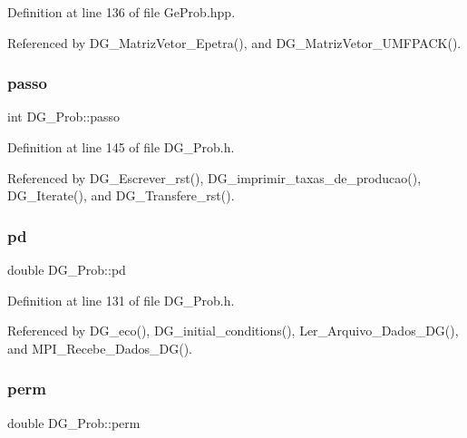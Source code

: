 Definition at line 136 of file Ge\+Prob.\+hpp.



Referenced by D\+G\+\_\+\+Matriz\+Vetor\+\_\+\+Epetra(), and D\+G\+\_\+\+Matriz\+Vetor\+\_\+\+U\+M\+F\+P\+A\+C\+K().

\mbox{\label{classDG__Prob_a496f504b7728fe91007014a47897132e}} 
\subsubsection{\texorpdfstring{passo}{passo}}
{\footnotesize\ttfamily int D\+G\+\_\+\+Prob\+::passo\hspace{0.3cm}{\ttfamily [private]}}



Definition at line 145 of file D\+G\+\_\+\+Prob.\+h.



Referenced by D\+G\+\_\+\+Escrever\+\_\+rst(), D\+G\+\_\+imprimir\+\_\+taxas\+\_\+de\+\_\+producao(), D\+G\+\_\+\+Iterate(), and D\+G\+\_\+\+Transfere\+\_\+rst().

\mbox{\label{classDG__Prob_a5c6b1eeb7d2986b650fa16b90a07dae8}} 
\subsubsection{\texorpdfstring{pd}{pd}}
{\footnotesize\ttfamily double D\+G\+\_\+\+Prob\+::pd\hspace{0.3cm}{\ttfamily [private]}}



Definition at line 131 of file D\+G\+\_\+\+Prob.\+h.



Referenced by D\+G\+\_\+eco(), D\+G\+\_\+initial\+\_\+conditions(), Ler\+\_\+\+Arquivo\+\_\+\+Dados\+\_\+\+D\+G(), and M\+P\+I\+\_\+\+Recebe\+\_\+\+Dados\+\_\+\+D\+G().

\mbox{\label{classDG__Prob_ad557b623b51a795a561c8062ee6d01f0}} 
\subsubsection{\texorpdfstring{perm}{perm}}
{\footnotesize\ttfamily double D\+G\+\_\+\+Prob\+::perm\hspace{0.3cm}{\ttfamily [private]}}



